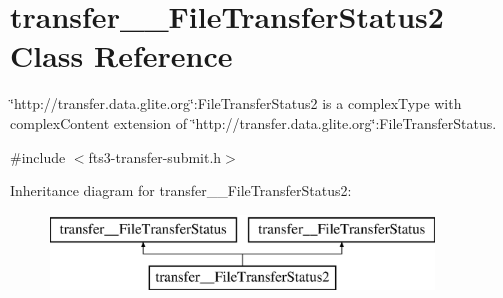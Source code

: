 \section{transfer\_\-\_\-FileTransferStatus2 Class Reference}
\label{classtransfer____FileTransferStatus2}


\char`\"{}http://transfer.data.glite.org\char`\"{}:FileTransferStatus2 is a complexType with complexContent extension of \char`\"{}http://transfer.data.glite.org\char`\"{}:FileTransferStatus.  




{\ttfamily \#include $<$fts3-\/transfer-\/submit.h$>$}

Inheritance diagram for transfer\_\-\_\-FileTransferStatus2:\begin{figure}[H]
\begin{center}
\leavevmode
\includegraphics[height=2.000000cm]{classtransfer____FileTransferStatus2}
\end{center}
\end{figure}
